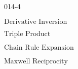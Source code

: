 \begin{mitframe}{014-4}

    
\begin{listone}
        
    \item $\text{Derivative Inversion}$
        
    \item $\text{Triple Product}$
         
    \item $\text{Chain Rule Expansion}$
    
    \item $\text{Maxwell Reciprocity}$
    
\end{listone}			

\end{mitframe}